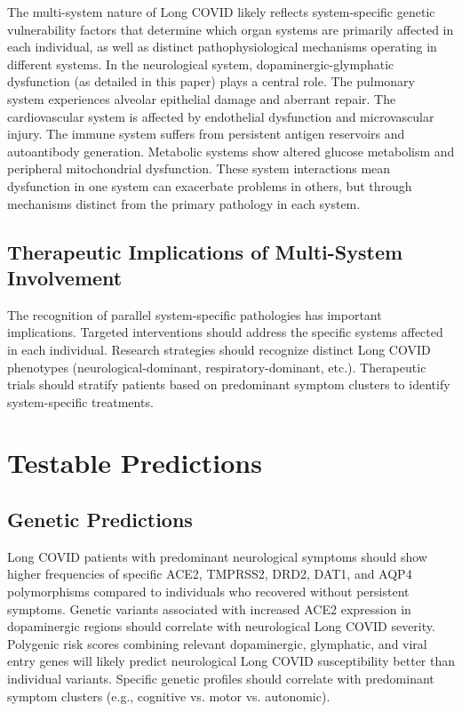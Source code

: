 \documentclass[12pt]{article}
\begin{document}
The multi-system nature of Long COVID likely reflects system-specific genetic vulnerability factors that determine which organ systems are primarily affected in each individual, as well as distinct pathophysiological mechanisms operating in different systems. In the neurological system, dopaminergic-glymphatic dysfunction (as detailed in this paper) plays a central role. The pulmonary system experiences alveolar epithelial damage and aberrant repair. The cardiovascular system is affected by endothelial dysfunction and microvascular injury. The immune system suffers from persistent antigen reservoirs and autoantibody generation. Metabolic systems show altered glucose metabolism and peripheral mitochondrial dysfunction. These system interactions mean dysfunction in one system can exacerbate problems in others, but through mechanisms distinct from the primary pathology in each system.

\subsection*{Therapeutic Implications of Multi-System Involvement}

The recognition of parallel system-specific pathologies has important implications. Targeted interventions should address the specific systems affected in each individual. Research strategies should recognize distinct Long COVID phenotypes (neurological-dominant, respiratory-dominant, etc.). Therapeutic trials should stratify patients based on predominant symptom clusters to identify system-specific treatments.

\section{Testable Predictions}

\subsection*{Genetic Predictions}

Long COVID patients with predominant neurological symptoms should show higher frequencies of specific ACE2, TMPRSS2, DRD2, DAT1, and AQP4 polymorphisms compared to individuals who recovered without persistent symptoms. Genetic variants associated with increased ACE2 expression in dopaminergic regions should correlate with neurological Long COVID severity. Polygenic risk scores combining relevant dopaminergic, glymphatic, and viral entry genes will likely predict neurological Long COVID susceptibility better than individual variants. Specific genetic profiles should correlate with predominant symptom clusters (e.g., cognitive vs. motor vs. autonomic).
\end{document}

